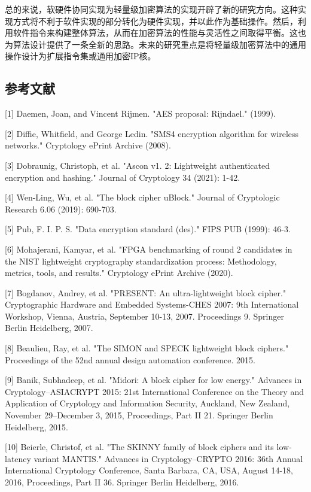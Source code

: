 \documentclass{ctexart}
\begin{document}
总的来说，软硬件协同实现为轻量级加密算法的实现开辟了新的研究方向。这种实现方式将不利于软件实现的部分转化为硬件实现，并以此作为基础操作。然后，利用软件指令来构建整体算法，从而在加密算法的性能与灵活性之间取得平衡。这也为算法设计提供了一条全新的思路。未来的研究重点是将轻量级加密算法中的通用操作设计为扩展指令集或通用加密IP核。


\subsection{参考文献}
[1] Daemen, Joan, and Vincent Rijmen. "AES proposal: Rijndael." (1999).

    [2] Diffie, Whitfield, and George Ledin. "SMS4 encryption algorithm for wireless networks." Cryptology ePrint Archive (2008).

    [3] Dobraunig, Christoph, et al. "Ascon v1. 2: Lightweight authenticated encryption and hashing." Journal of Cryptology 34 (2021): 1-42.

[4] Wen-Ling, Wu, et al. "The block cipher uBlock." Journal of Cryptologic Research 6.06 (2019): 690-703.

[5] Pub, F. I. P. S. "Data encryption standard (des)." FIPS PUB (1999): 46-3.

[6] Mohajerani, Kamyar, et al. "FPGA benchmarking of round 2 candidates in the NIST lightweight cryptography standardization process: Methodology, metrics, tools, and results." Cryptology ePrint Archive (2020).

    [7] Bogdanov, Andrey, et al. "PRESENT: An ultra-lightweight block cipher." Cryptographic Hardware and Embedded Systems-CHES 2007: 9th International Workshop, Vienna, Austria, September 10-13, 2007. Proceedings 9. Springer Berlin Heidelberg, 2007.

    [8] Beaulieu, Ray, et al. "The SIMON and SPECK lightweight block ciphers." Proceedings of the 52nd annual design automation conference. 2015.

    [9] Banik, Subhadeep, et al. "Midori: A block cipher for low energy." Advances in Cryptology–ASIACRYPT 2015: 21st International Conference on the Theory and Application of Cryptology and Information Security, Auckland, New Zealand, November 29--December 3, 2015, Proceedings, Part II 21. Springer Berlin Heidelberg, 2015.

    [10] Beierle, Christof, et al. "The SKINNY family of block ciphers and its low-latency variant MANTIS." Advances in Cryptology–CRYPTO 2016: 36th Annual International Cryptology Conference, Santa Barbara, CA, USA, August 14-18, 2016, Proceedings, Part II 36. Springer Berlin Heidelberg, 2016.
\end{document}
